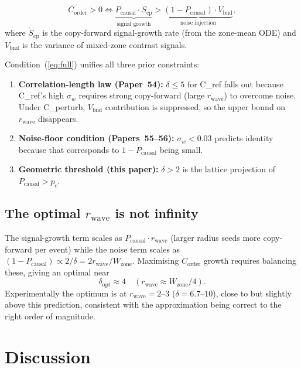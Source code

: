 \documentclass[11pt,a4paper]{article}
\newcommand{\Corder}{C_{\mathrm{order}}}
\newcommand{\sw}{\sigma_w}
\newcommand{\Pcausal}{P_{\mathrm{causal}}}
\begin{document}
\begin{equation}
  \dot{\Corder} > 0 \iff
  \underbrace{\Pcausal \cdot \dot{S}_\mathrm{cp}}_{\text{signal growth}}
  > \underbrace{(1-\Pcausal)\cdot V_\mathrm{bnd}}_{\text{noise injection}},
  \label{eq:full}
\end{equation}
where $\dot{S}_\mathrm{cp}$ is the copy-forward signal-growth rate (from the
zone-mean ODE) and $V_\mathrm{bnd}$ is the variance of mixed-zone contrast signals.

Condition~(\ref{eq:full}) unifies all three prior constraints:
\begin{enumerate}
  \item \textbf{Correlation-length law (Paper~54):} $\delta \leq 5$ for C\_ref
    falls out because C\_ref's high $\sw$ requires strong copy-forward (large
    $r_\mathrm{wave}$) to overcome noise. Under C\_perturb, $V_\mathrm{bnd}$
    contribution is suppressed, so the upper bound on $r_\mathrm{wave}$ disappears.
  \item \textbf{Noise-floor condition (Papers~55--56):} $\sw < 0.03$ predicts
    identity because that corresponds to $1-\Pcausal$ being small.
  \item \textbf{Geometric threshold (this paper):} $\delta > 2$ is the
    lattice projection of $\Pcausal > p_c$.
\end{enumerate}

\subsection{The optimal $r_\mathrm{wave}$ is not infinity}

The signal-growth term scales as $\Pcausal \cdot r_\mathrm{wave}$
(larger radius seeds more copy-forward per event) while the noise term scales
as $(1-\Pcausal) \propto 2/\delta = 2r_\mathrm{wave}/W_\mathrm{zone}$.
Maximising $\Corder$ growth requires balancing these, giving an optimal
near
\begin{equation}
  \delta_\mathrm{opt} \approx 4 \quad (r_\mathrm{wave} \approx W_\mathrm{zone}/4).
\end{equation}
Experimentally the optimum is at $r_\mathrm{wave}=2$--$3$ ($\delta=6.7$--$10$),
close to but slightly above this prediction, consistent with the approximation
being correct to the right order of magnitude.

\section{Discussion}
\end{document}
